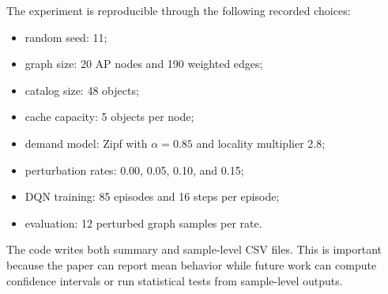 The experiment is reproducible through the following recorded choices:
\begin{itemize}
    \item random seed: 11;
    \item graph size: 20 AP nodes and 190 weighted edges;
    \item catalog size: 48 objects;
    \item cache capacity: 5 objects per node;
    \item demand model: Zipf with \(\alpha=0.85\) and locality multiplier 2.8;
    \item perturbation rates: 0.00, 0.05, 0.10, and 0.15;
    \item DQN training: 85 episodes and 16 steps per episode;
    \item evaluation: 12 perturbed graph samples per rate.
\end{itemize}

The code writes both summary and sample-level CSV files. This is important because the paper can report mean behavior while future work can compute confidence intervals or run statistical tests from sample-level outputs.
